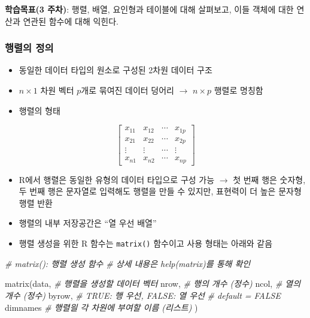 \documentclass[
  11pt,
]{krantz}
\makeatletter
\newenvironment{Shaded}{\begin{snugshade}}{\end{snugshade}}
\newcommand{\CommentTok}[1]{\textcolor[rgb]{0.37,0.37,0.37}{\textit{#1}}}
\newcommand{\FunctionTok}[1]{\textcolor[rgb]{0,0,0}{#1}}
\newcommand{\NormalTok}[1]{#1}
\providecommand{\tightlist}{%
  \setlength{\itemsep}{0pt}\setlength{\parskip}{0pt}}
\newenvironment{kframe}{%
\medskip{}
\setlength{\fboxsep}{.8em}
 \def\at@end@of@kframe{}%
 \ifinner\ifhmode%
  \def\at@end@of@kframe{\end{minipage}}%
  \begin{minipage}{\columnwidth}%
 \fi\fi%
 \def\FrameCommand##1{\hskip\@totalleftmargin \hskip-\fboxsep
 \colorbox{shadecolor}{##1}\hskip-\fboxsep
     \hskip-\linewidth \hskip-\@totalleftmargin \hskip\columnwidth}%
 \MakeFramed {\advance\hsize-\width
   \@totalleftmargin\z@ \linewidth\hsize
   \@setminipage}}%
 {\par\unskip\endMakeFramed%
 \at@end@of@kframe}
\newenvironment{rmdblock}[1]
  {
  \begin{itemize}
  \renewcommand{\labelitemi}{
    \raisebox{-.7\height}[0pt][0pt]{
      {\setkeys{Gin}{width=3em,keepaspectratio}\texttt{[image: images/\#1]}}
    }
  }
  \setlength{\fboxsep}{1em}
  \begin{kframe}
  \item
  }
  {
  \end{kframe}
  \end{itemize}
  }
\newenvironment{rmdnote}
  {\begin{rmdblock}{note}}
  {\end{rmdblock}}
\makeatother
\begin{document}
\begin{rmdnote}
\textbf{학습목표(3 주차)}: 행렬, 배열, 요인형과 테이블에 대해 살펴보고, 이들 객체에 대한 연산과 연관된 함수에 대해 익힌다.
\end{rmdnote}

\normalsize

\hypertarget{def-matrix}{%
\subsubsection*{\texorpdfstring{\textbf{행렬의 정의}}{행렬의 정의}}\label{def-matrix}}


\begin{itemize}
\tightlist
\item
  동일한 데이터 타입의 원소로 구성된 2차원 데이터 구조
\item
  \(n \times 1\) 차원 벡터 \(p\)개로 묶여진 데이터 덩어리 \(\rightarrow\) \(n \times p\) 행렬로 명칭함
\item
  행렬의 형태
\end{itemize}

\[\begin{bmatrix}
x_{11} & x_{12} & \cdots & x_{1p} \\
x_{21} & x_{22} & \cdots & x_{2p} \\
\vdots & \vdots & \cdots & \vdots \\
x_{n1} & x_{n2} & \cdots & x_{np}
\end{bmatrix}
\]

\begin{itemize}
\tightlist
\item
  R에서 행렬은 동일한 유형의 데이터 타입으로 구성 가능 \(\rightarrow\) 첫 번째 행은 숫자형, 두 번째 행은 문자열로 입력해도 행렬을 만들 수 있지만, 표현력이 더 높은 문자형 행렬 반환
\item
  행렬의 내부 저장공간은 ``열 우선 배열''
\item
  행렬 생성을 위한 R 함수는 \texttt{matrix()} 함수이고 사용 형태는 아래와 같음
\end{itemize}

\footnotesize

\begin{Shaded}
\begin{Highlighting}[]
\CommentTok{\# matrix(): 행렬 생성 함수}
\CommentTok{\# 상세 내용은 help(matrix)를 통해 확인}

\FunctionTok{matrix}\NormalTok{(data, }\CommentTok{\# 행렬을 생성할 데이터 벡터 }
\NormalTok{       nrow, }\CommentTok{\# 행의 개수 (정수)}
\NormalTok{       ncol, }\CommentTok{\# 열의 개수 (정수)}
\NormalTok{       byrow, }\CommentTok{\# TRUE: 행 우선, FALSE: 열 우선}
              \CommentTok{\# default = FALSE}
\NormalTok{       dimnames }\CommentTok{\# 행렬읠 각 차원에 부여할 이름 (리스트)}
\NormalTok{       )}
\end{Highlighting}
\end{Shaded}
\end{document}
